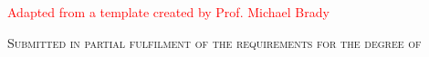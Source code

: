 \begin{titlepage}
\textcolor{red}{Adapted from a template created by Prof. Michael Brady}


\vfill

\textsc{\normalsize Submitted in partial fulfilment of the requirements for the degree of \\
\degree}

\vfill %

\end{titlepage}